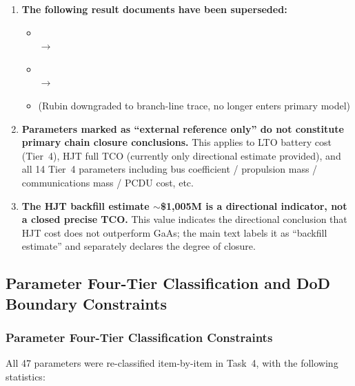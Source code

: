 \begin{enumerate}
  \item \textbf{The following result documents have been superseded:}
  \begin{itemize}
    \item {}\\
      $\to$ 
    \item {}\\
      $\to$ 
    \item {} (Rubin downgraded to branch-line trace, no longer enters primary model)
  \end{itemize}

  \item \textbf{Parameters marked as ``external reference only'' do not constitute primary chain closure conclusions.} This applies to LTO battery cost (Tier~4), HJT full TCO (currently only directional estimate provided), and all 14 Tier~4 parameters including bus coefficient / propulsion mass / communications mass / PCDU cost, etc.

  \item \textbf{The HJT backfill estimate $\sim$\$1,005M is a directional indicator, not a closed precise TCO.} This value indicates the directional conclusion that HJT cost does not outperform GaAs; the main text labels it as ``backfill estimate'' and separately declares the degree of closure.
\end{enumerate}

\subsection{Parameter Four-Tier Classification and DoD Boundary Constraints}
\label{sec:dod-boundary}

\subsubsection{Parameter Four-Tier Classification Constraints}

All 47 parameters were re-classified item-by-item in Task~4, with the following statistics:

